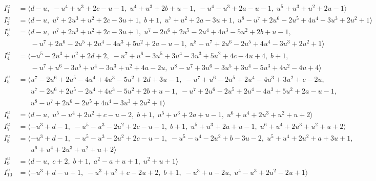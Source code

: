 \documentclass[1p]{elsarticle_modified}
\theoremstyle{definition}
\begin{document}
\begin{align*}
I^u_{1}&=\langle 
d- u,\;- u^4+u^3+2 c- u-1,\;u^4+u^3+2 b+u-1,\;- u^4- u^3+2 a- u-1,\;u^5+u^3+u^2+2 u-1\rangle \\
I^u_{2}&=\langle 
d- u,\;u^7+2 u^3+u^2+2 c-3 u+1,\;b+1,\;u^7+u^2+2 a-3 u+1,\;u^8- u^7+2 u^6-2 u^5+4 u^4-3 u^3+2 u^2+1\rangle \\
I^u_{3}&=\langle 
d- u,\;u^7+2 u^3+u^2+2 c-3 u+1,\;u^7-2 u^6+2 u^5-2 u^4+4 u^3-5 u^2+2 b+u-1,\\
\phantom{I^u_{3}}&\phantom{= \langle  }- u^7+2 u^6-2 u^5+2 u^4-4 u^3+5 u^2+2 a- u-1,\;u^8- u^7+2 u^6-2 u^5+4 u^4-3 u^3+2 u^2+1\rangle \\
I^u_{4}&=\langle 
- u^5-2 u^3+u^2+2 d+2,\;- u^7+u^6-3 u^5+3 u^4-3 u^3+5 u^2+4 c-4 u+4,\;b+1,\\
\phantom{I^u_{4}}&\phantom{= \langle  }- u^7+u^6-3 u^5+u^4-3 u^3+u^2+4 a-2 u,\;u^8- u^7+3 u^6-3 u^5+3 u^4-5 u^3+4 u^2-4 u+4\rangle \\
I^u_{5}&=\langle 
u^7-2 u^6+2 u^5-4 u^4+4 u^3-5 u^2+2 d+3 u-1,\;- u^7+u^6-2 u^5+2 u^4-4 u^3+3 u^2+c-2 u,\\
\phantom{I^u_{5}}&\phantom{= \langle  }u^7-2 u^6+2 u^5-2 u^4+4 u^3-5 u^2+2 b+u-1,\;- u^7+2 u^6-2 u^5+2 u^4-4 u^3+5 u^2+2 a- u-1,\\
\phantom{I^u_{5}}&\phantom{= \langle  }u^8- u^7+2 u^6-2 u^5+4 u^4-3 u^3+2 u^2+1\rangle \\
I^u_{6}&=\langle 
d- u,\;u^5- u^4+2 u^2+c- u-2,\;b+1,\;u^5+u^3+2 a+u-1,\;u^6+u^4+2 u^3+u^2+u+2\rangle \\
I^u_{7}&=\langle 
- u^3+d-1,\;- u^5- u^3-2 u^2+2 c- u-1,\;b+1,\;u^5+u^3+2 a+u-1,\;u^6+u^4+2 u^3+u^2+u+2\rangle \\
I^u_{8}&=\langle 
- u^3+d-1,\;- u^5- u^3-2 u^2+2 c- u-1,\;- u^5- u^4-2 u^2+b-3 u-2,\;u^5+u^4+2 u^2+a+3 u+1,\\
\phantom{I^u_{8}}&\phantom{= \langle  }u^6+u^4+2 u^3+u^2+u+2\rangle \\
I^u_{9}&=\langle 
d- u,\;c+2,\;b+1,\;a^2- a+u+1,\;u^2+u+1\rangle \\
I^u_{10}&=\langle 
- u^3+d- u+1,\;- u^3+u^2+c-2 u+2,\;b+1,\;- u^3+a-2 u,\;u^4- u^3+2 u^2-2 u+1\rangle \\
\end{align*}\\
\end{document}
